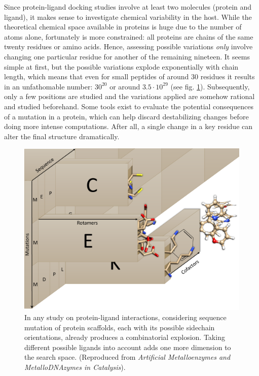 Since protein-ligand docking studies involve at least two molecules (protein and ligand), it makes sense to investigate chemical variability in the host. While the theoretical chemical space available in proteins is huge due to the number of atoms alone, fortunately is more constrained: all proteins are chains of the same twenty residues or amino acids. Hence, assessing possible variations \textit{only} involve changing one particular residue for another of the remaining nineteen. It seems simple at first, but the possible variations explode exponentially with chain length, which means that even for small peptides of around 30 residues it results in an unfathomable number: $ 30^{20} $ or around $ 3.5·10^{29} $ (see fig. \ref{fig:chemicalspace}). Subsequently, only a few positions are studied and the variations applied are somehow rational and studied beforehand. Some tools exist to evaluate the potential consequences of a mutation in a protein,\cite{kumar2009predicting,quan2016strum,fariselli2015inps,dehouck2011popmusic} which can help discard destabilizing changes before doing more intense computations. After all, a single change in a key residue can alter the final structure dramatically.\cite{kumar2006protherm}

\begin{figure}[hbtp]
	\includegraphics[width=\textwidth]{./figures/02/chemical_space.pdf}
	\caption[Chemobiological spaces]{
		In any study on protein-ligand interactions, considering sequence mutation of protein scaffolds, each with its possible sidechain orientations, already produces a combinatorial explosion. Taking different possible ligands into account adds one more dimension to the search space. (Reproduced from \textit{Artificial Metalloenzymes and MetalloDNAzymes in Catalysis}\cite{wileybook}).
	}
	\label{fig:chemicalspace}
\end{figure}

